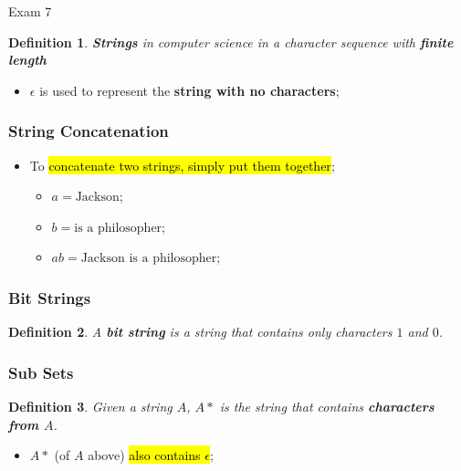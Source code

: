 \documentclass{note}
\newtheorem{definition}{Definition}
\begin{document}
\begin{note}{Exam 7}
	\begin{definition}
	    \textbf{Strings} in computer science in a character sequence with \textbf{finite length}
	\end{definition}

    	\begin{itemize}
	    \item $ \epsilon $ is used to represent the \textbf{string with no characters};
	\end{itemize}

	\subsubsection{String Concatenation}

	\begin{itemize}
	    \item To \hl{concatenate two strings, simply put them together};
		\begin{itemize}
		    \item $ a = \text{Jackson} $;
		    \item $ b = \text{is a philosopher} $;
		    \item $ ab = \text{Jackson is a philosopher} $;
		\end{itemize}
	\end{itemize}

	\subsubsection{Bit Strings}

	\begin{definition}
	    A \textbf{bit string} is a string that contains only characters $ 1 $ and $ 0 $.
	\end{definition}

	\subsubsection{Sub Sets}

	\begin{definition}
	    Given a string $ A $, $ A* $ is the string that contains \textbf{characters from $ A $}.
	\end{definition}

	\begin{itemize}
	    \item $ A* $ (of $ A $ above) \hl{also contains $ \epsilon $};
	\end{itemize}


\end{note}
\end{document}
